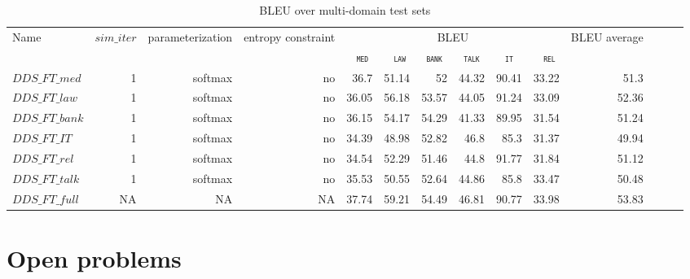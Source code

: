 \documentclass[12pt,times,a4paper,twoside]{article}
\newcommand{\domain}[1]{\texttt{\textsc{#1}}}
\newcommand{\system}[1]{\texttt{{#1}}}
\theoremstyle{definition}
\begin{document}
\begin{table}[htb]
  \centering%
  \begin{adjustbox}{width=1.0\columnwidth,center}
  \begin{tabular}{|p{3.0cm}|*{13}{r|}} \hline
    \multirow{2}{*}{Name} & \multirow{2}{*}{$sim\_iter$} & \multirow{2}{*}{parameterization} & \multirow{2}{*}{entropy constraint} & \multicolumn{6}{|c|}{BLEU} & \multirow{2}{*}{BLEU average} \\ \cline{5-10}	
   & & & & \multicolumn{1}{c|}{\domain{ med}} & \multicolumn{1}{c|}{\domain{ law}} & \multicolumn{1}{c|}{\domain{bank}} & \multicolumn{1}{c|}{\domain{talk}} & \multicolumn{1}{c|}{\domain{ it }} & \multicolumn{1}{c|}{\domain{ rel}} &  \\
    \hline
  \system{$DDS\_FT\_med$} & 1 & softmax & no & 36.7&51.14&52&44.32&90.41&33.22&51.3\\
  \system{$DDS\_FT\_law$} & 1 & softmax & no &36.05&56.18&53.57&44.05&91.24&33.09&52.36\\
  \system{$DDS\_FT\_bank$} & 1 & softmax & no &36.15&54.17&54.29&41.33&89.95&31.54&51.24 \\
  \system{$DDS\_FT\_IT$} & 1 & softmax & no &34.39&48.98&52.82&46.8&85.3&31.37&49.94 \\
  \system{$DDS\_FT\_rel$} & 1 & softmax & no & 34.54&52.29&51.46&44.8&91.77&31.84&51.12\\
  \system{$DDS\_FT\_talk$} & 1 & softmax & no & 35.53&50.55&52.64&44.86&85.8&33.47&50.48\\
  \system{$DDS\_FT\_full$} & NA & NA & NA & 37.74&59.21	&54.49&46.81&90.77&33.98&53.83\\
  \hline
  \end{tabular}
  \end{adjustbox}
  \caption{BLEU over multi-domain test sets}
  \label{tab:ft}
\end{table}

\section{Open problems}
\end{document}
